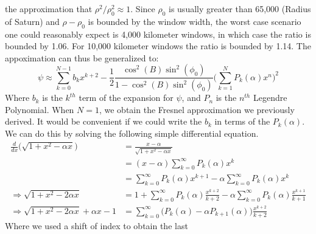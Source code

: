 \documentclass[crop=false,class=book,oneside]{standalone}
\begin{document}
            the approximation that
            $\rho^{2}/\rho_{0}^{2}\approx{1}$.
            Since $\rho_{0}$ is usually greater
            than 65,000 (Radius of Saturn) and
            $\rho-\rho_{0}$ is bounded by the window width,
            the worst case scenario one could reasonably
            expect is 4,000 kilometer windows, in which
            case the ratio is bounded by 1.06. For
            10,000 kilometer windows the ratio is bounded
            by 1.14. The appoximation can thus be
            generalized to:
            \begin{equation*}
                \psi\approx
                \sum_{k=0}^{N-1}b_{k}x^{k+2}
                -\frac{1}{2}
                \frac{\cos^{2}(B)\sin^{2}(\phi_{0})}
                     {1-\cos^{2}(B)\sin^{2}(\phi_{0})}
                \Big(\sum_{k=1}^{N}P_{k}(\alpha)x^{n}\Big)^{2}
            \end{equation*}
            Where $b_{k}$ is the $k^{th}$ term of the expansion
            for $\psi$, and $P_{n}$ is the $n^{th}$
            Legendre Polynomial. When $N=1$, we obtain
            the Fresnel approximation we previously
            derived. It would be convenient if we could
            write the $b_{k}$ in terms of the
            $P_{k}(\alpha)$. We can do this by solving the
            following simple differential equation.
            \begin{align*}
                \frac{d}{dx}
                \Big(\sqrt{1+x^{2}-\alpha{x}}\Big)
                &=\frac{x-\alpha}{\sqrt{1+x^{2}-\alpha{x}}}\\
                &=(x-\alpha)
                  \sum_{k=0}^{\infty}P_{k}(\alpha)x^{k}\\
                &=\sum_{k=0}^{\infty}P_{k}(\alpha)x^{k+1}
                 -\alpha\sum_{k=0}^{\infty}P_{k}(\alpha)x^{k}\\
                \Rightarrow
                \sqrt{1+x^{2}-2\alpha{x}}
                &=1+\sum_{k=0}^{\infty}P_{k}(\alpha)
                    \frac{x^{k+2}}{k+2}
                 -\alpha\sum_{k=0}^{\infty}P_{k}(\alpha)
                  \frac{x^{k+1}}{k+1}\\
                \Rightarrow
                \sqrt{1+x^{2}-2\alpha{x}}+\alpha{x}-1
                &=\sum_{k=0}^{\infty}
                    \Big(
                        P_{k}(\alpha)-\alpha{P_{k+1}}(\alpha)
                    \Big)
                    \frac{x^{k+2}}{k+2}
            \end{align*}
            Where we used a shift of index to obtain the last
\end{document}
